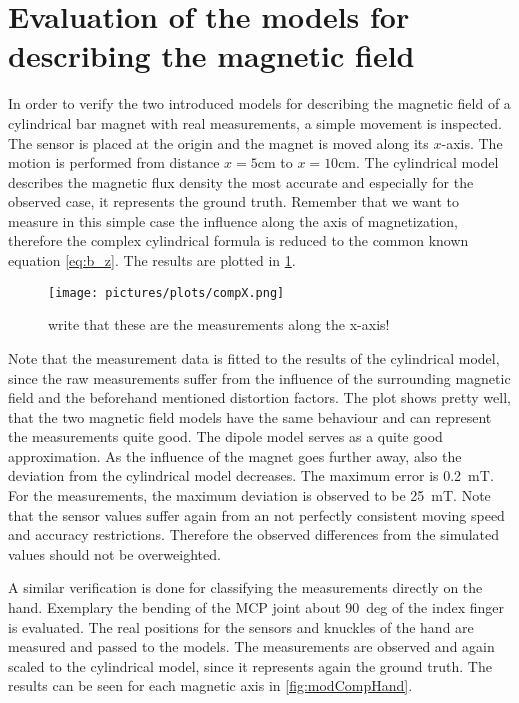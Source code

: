\section{Evaluation of the models for describing the magnetic field} \label{sec:modelDif}

In order to verify the two introduced models for describing the magnetic field of a cylindrical bar magnet with real measurements, a simple movement is inspected. The sensor is placed at the origin and the magnet is moved along its $ x $-axis. The motion is performed from distance $ x=5\si{\cm} $ to $ x=10\si{\cm} $. The cylindrical model describes the magnetic flux density the most accurate and especially for the observed case, it represents the ground truth. Remember that we want to measure in this simple case the influence along the axis of magnetization, therefore the complex cylindrical formula is reduced to the common known equation \ref{eq:b_z}. The results are plotted in \ref{fig:modCompFlat}.

\begin{figure}[h]
\centering
\texttt{[image: pictures/plots/compX.png]}
\caption{write that these are the measurements along the x-axis!}
\label{fig:modCompFlat}
\end{figure}

Note that the measurement data is fitted to the results of the cylindrical model, since the raw measurements suffer from the influence of the surrounding magnetic field and the beforehand mentioned distortion factors. The plot shows pretty well, that the two magnetic field models have the same behaviour and can represent the measurements quite good. The dipole model serves as a quite good approximation. As the influence of the magnet goes further away, also the deviation from the cylindrical model decreases. The maximum error is \SI{0.2}{\milli \tesla}. For the measurements, the maximum deviation is observed to be \SI{25}{\milli \tesla}. Note that the sensor values suffer again from an not perfectly consistent moving speed and accuracy restrictions. Therefore the observed differences from the simulated values should not be overweighted.

A similar verification is done for classifying the measurements directly on the hand. Exemplary the bending of the \ac{MCP} joint about \SI{90}{deg} of the index finger is evaluated. The real positions for the sensors and knuckles of the hand are measured and passed to the models. The measurements are observed and again scaled to the cylindrical model, since it represents again the ground truth. The results can be seen for each magnetic axis in \ref{fig:modCompHand}.

